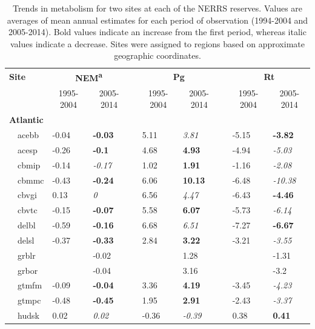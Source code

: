 \documentclass[10pt,letterpaper]{article}\usepackage[]{graphicx}\usepackage[]{color}
\begin{document}
\begin{table}[!tbp]
{\footnotesize
\caption{Trends in metabolism for two sites at each of the \gls{NERRS} reserves.  Values are averages of mean annual estimates for each period of observation (1994-2004 and 2005-2014). Bold values indicate an increase from the first period, whereas italic values indicate a decrease. Sites were assigned to regions based on approximate geographic coordinates.\label{tab:metab_tab}} 
\begin{center}
\begin{tabular}{lllcllcll}
\hline\hline
\multicolumn{1}{l}{\bfseries Site}&\multicolumn{2}{c}{\bfseries NEM\textsuperscript{a}}&\multicolumn{1}{c}{\bfseries }&\multicolumn{2}{c}{\bfseries Pg}&\multicolumn{1}{c}{\bfseries }&\multicolumn{2}{c}{\bfseries Rt}\tabularnewline
\cline{2-3} \cline{5-6} \cline{8-9}
\multicolumn{1}{l}{}&\multicolumn{1}{c}{1995-2004}&\multicolumn{1}{c}{2005-2014}&\multicolumn{1}{c}{}&\multicolumn{1}{c}{1995-2004}&\multicolumn{1}{c}{2005-2014}&\multicolumn{1}{c}{}&\multicolumn{1}{c}{1995-2004}&\multicolumn{1}{c}{2005-2014}\tabularnewline
\hline
{\bfseries Atlantic}&&&&&&&&\tabularnewline
~~acebb&-0.04&{\bf -0.03}&&5.11&{\it 3.81}&&-5.15&{\bf -3.82}\tabularnewline
~~acesp&-0.26&{\bf -0.1}&&4.68&{\bf 4.93}&&-4.94&{\it -5.03}\tabularnewline
~~cbmip&-0.14&{\it -0.17}&&1.02&{\bf 1.91}&&-1.16&{\it -2.08}\tabularnewline
~~cbmmc&-0.43&{\bf -0.24}&&6.06&{\bf 10.13}&&-6.48&{\it -10.38}\tabularnewline
~~cbvgi&0.13&{\it 0}&&6.56&{\it 4.47}&&-6.43&{\bf -4.46}\tabularnewline
~~cbvtc&-0.15&{\bf -0.07}&&5.58&{\bf 6.07}&&-5.73&{\it -6.14}\tabularnewline
~~delbl&-0.59&{\bf -0.16}&&6.68&{\it 6.51}&&-7.27&{\bf -6.67}\tabularnewline
~~delsl&-0.37&{\bf -0.33}&&2.84&{\bf 3.22}&&-3.21&{\it -3.55}\tabularnewline
~~grblr&&-0.02&&&1.28&&&-1.31\tabularnewline
~~grbor&&-0.04&&&3.16&&&-3.2\tabularnewline
~~gtmfm&-0.09&{\bf -0.04}&&3.36&{\bf 4.19}&&-3.45&{\it -4.23}\tabularnewline
~~gtmpc&-0.48&{\bf -0.45}&&1.95&{\bf 2.91}&&-2.43&{\it -3.37}\tabularnewline
~~hudsk&0.02&{\it 0.02}&&-0.36&{\it -0.39}&&0.38&{\bf 0.41}\tabularnewline

\end{tabular}
\end{center}}
\end{table}
\end{document}
